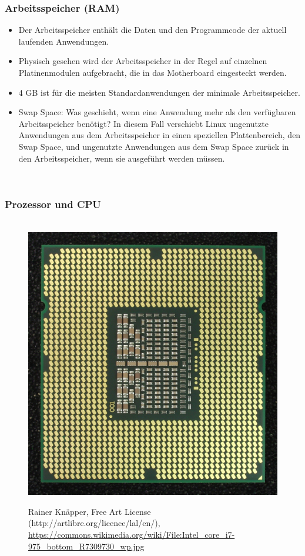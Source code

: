 	\subsubsection{Arbeitsspeicher (RAM)}
	\begin{itemize}
		\item Der Arbeitsspeicher enthält die Daten und den Programmcode der aktuell laufenden Anwendungen.
		\item Physisch gesehen wird der Arbeitsspeicher in der Regel auf einzelnen Platinenmodulen aufgebracht, die in das Motherboard eingesteckt werden.
		\item  4 GB ist für die meisten Standardanwendungen der minimale Arbeitsspeicher.
		\item Swap Space: Was geschieht, wenn eine Anwendung mehr als den verfügbaren Arbeitsspeicher benötigt? In diesem Fall verschiebt Linux ungenutzte Anwendungen aus dem Arbeitsspeicher in einen speziellen Plattenbereich, den Swap Space, und ungenutzte Anwendungen aus dem Swap Space zurück in den Arbeitsspeicher, wenn sie ausgeführt werden müssen.
	\end{itemize}
%
%
~\\
\subsubsection{Prozessor und CPU}
\begin{figure}[h!]
	\centering
	~\\
	\includegraphics[width=0.3\linewidth]{./media/i7} \\
\caption[Intel Core i7]{ Rainer Knäpper, Free Art License (http://artlibre.org/licence/lal/en/), \url{https://commons.wikimedia.org/wiki/File:Intel_core_i7-975_bottom_R7309730_wp.jpg}}
\end{figure}

